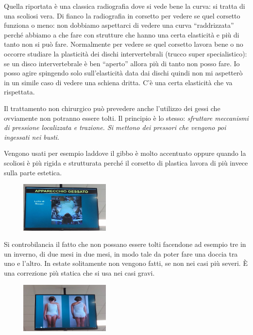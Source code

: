 Quella riportata è una classica radiografia dove si vede bene la curva: si tratta di una scoliosi vera. Di fianco la radiografia in corsetto per vedere se quel corsetto funziona o meno: non dobbiamo aspettarci di vedere una curva ``raddrizzata'' perché abbiamo a che fare con strutture che hanno una certa elasticità e più di tanto non si può fare.
Normalmente per vedere se quel corsetto lavora bene o no occorre studiare la plasticità dei dischi intervertebrali (trucco super specialistico): se un disco intervertebrale è ben ``aperto'' allora più di tanto non posso fare. Io posso agire spingendo solo sull'elasticità data dai dischi quindi non mi aspetterò in un simile caso di vedere una schiena dritta. C'è una certa elasticità che va rispettata.

Il trattamento non chirurgico può prevedere anche l'utilizzo dei gessi che ovviamente non potranno essere tolti. Il principio è lo stesso:
\emph{sfruttare meccanismi di pressione localizzata e trazione. Si mettono dei pressori che vengono poi ingessati nei busti. }

Vengono usati per esempio laddove il gibbo è molto accentuato oppure quando la scoliosi è più rigida e strutturata perché il corsetto di plastica lavora di più invece sulla parte estetica.

\begin{figure}[!ht]
\centering
\includegraphics[width=0.4\textwidth]{013/image8.jpeg}
\end{figure}

Si controbilancia il fatto che non possano essere tolti facendone ad esempio tre in un inverno, di due mesi in due mesi, in modo tale da poter fare una doccia tra uno e l'altro. In estate solitamente non vengono fatti, se non nei casi più severi. È una correzione più statica
che si usa nei casi gravi.

\begin{figure}[!ht]
\centering
\includegraphics[width=0.4\textwidth]{013/image9.jpeg}
\end{figure}

